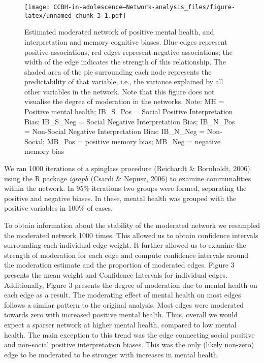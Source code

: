 \documentclass[
  english,
  man,floatsintext]{apa6}
\begin{document}
\begin{figure}
\centering
\texttt{[image: CCBH-in-adolescence---Network-analysis\_files/figure-latex/unnamed-chunk-3-1.pdf]}
\caption{\label{fig:unnamed-chunk-3}Estimated moderated network of positive mental health, and interpretation and memory cognitive biases. Blue edges represent positive associations, red edges represent negative associations; the width of the edge indicates the strength of this relationship. The shaded area of the pie surrounding each node represents the predictability of that variable, i.e., the variance explained by all other variables in the network. Note that this figure does not visualise the degree of moderation in the networks.
Note: MH = Positive mental health; IB\_S\_Pos = Social Positive Interpretation Bias; IB\_S\_Neg = Social Negative Interpretation Bias; IB\_N\_Pos = Non-Social Negative Interpretation Bias; IB\_N\_Neg = Non-Social; MB\_Pos = positive memory bias; MB\_Neg = negative memory bias}
\end{figure}

We ran 1000 iterations of a spinglass procedure (Reichardt \& Bornholdt, 2006) using the R package \emph{igraph} (Csardi \& Nepusz, 2006) to examine communalities within the network. In 95\% iterations two groups were formed, separating the positive and negative biases. In these, mental health was grouped with the positive variables in 100\% of cases.

To obtain information about the stability of the moderated network we resampled the moderated network 1000 times. This allowed us to obtain confidence intervals surrounding each individual edge weight. It further allowed us to examine the strength of moderation for each edge and compute confidence intervals around the moderation estimate and the proportion of moderated edges. Figure 3 presents the mean weight and Confidence Intervals for individual edges. Additionally, Figure 3 presents the degree of moderation due to mental health on each edge as a result. The moderating effect of mental health on most edges follows a similar pattern to the original analysis. Most edges were moderated towards zero with increased positive mental health. Thus, overall we would expect a sparser network at higher mental health, compared to low mental health. The main exception to this trend was the edge connecting social positive and non-social positive interpretation biases. This was the only (likely non-zero) edge to be moderated to be stronger with increases in mental health.
\end{document}
